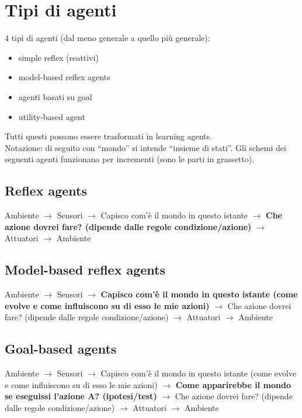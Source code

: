 \newpage

\section{Tipi di agenti}

4 tipi di agenti (dal meno generale a quello più generale):

\begin{itemize}
 \item simple reflex (reattivi)
 \item model-based reflex agents
 \item agenti basati su goal
 \item utility-based agent
\end{itemize}

Tutti questi possono essere trasformati in learning agents.\\

Notazione: di seguito con ``mondo'' si intende ``insieme di stati''. Gli schemi
dei seguenti agenti funzionano per incrementi (sono le parti in grassetto).

\subsection{Reflex agents}

Ambiente $\rightarrow$ Sensori $\rightarrow$ Capisco com'è il mondo in questo
istante $\rightarrow$ \textbf{Che azione dovrei fare? (dipende dalle regole
condizione/azione)} $\rightarrow$ Attuatori $\rightarrow$ Ambiente

\subsection{Model-based reflex agents}

Ambiente $\rightarrow$ Sensori $\rightarrow$ \textbf{Capisco com'è il mondo in
questo istante (come evolve e come influiscono su di esso le mie azioni)}
$\rightarrow$ Che azione dovrei fare? (dipende dalle regole condizione/azione)
$\rightarrow$ Attuatori $\rightarrow$ Ambiente

\subsection{Goal-based agents}

Ambiente $\rightarrow$ Sensori $\rightarrow$ Capisco com'è il mondo in questo
istante (come evolve e come influiscono su di esso le mie azioni) $\rightarrow$
\textbf{Come apparirebbe il mondo se eseguissi l'azione A? (ipotesi/test)}
$\rightarrow$ Che azione dovrei fare? (dipende dalle regole condizione/azione)
$\rightarrow$ Attuatori $\rightarrow$ Ambiente

